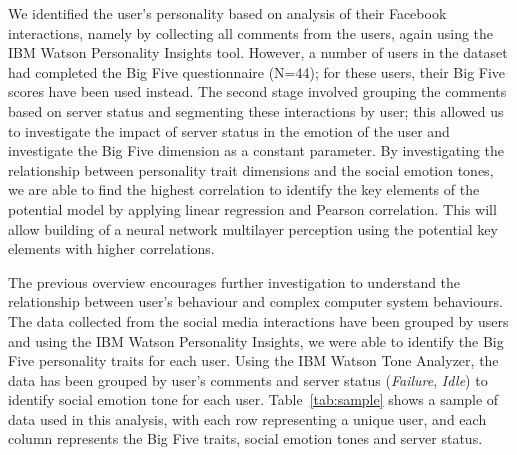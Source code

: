 \documentclass[graybox]{svmult}
\begin{document}
{We identified the user's personality based on analysis of their
Facebook interactions, namely by collecting all comments from the
users, again using the IBM Watson Personality Insights tool. However,
a number of users in the dataset had completed the Big Five
questionnaire (N=44); for these users, their Big Five scores have
been used instead. The second stage involved grouping the comments
based on server status and segmenting these interactions by user; this
allowed us to investigate the impact of server status in the emotion
of the user and investigate the Big Five dimension as a constant
parameter. By investigating the relationship between personality trait
dimensions and the social emotion tones, we are able to find the
highest correlation to identify the key elements of the potential
model by applying linear regression and Pearson correlation. This will
allow building of a neural network multilayer perception using the
potential key elements with higher correlations.

The previous overview encourages further investigation to understand
the relationship between user's behaviour and complex computer system
behaviours. The data collected from the social media interactions have
been grouped by users and using the IBM Watson Personality Insights,
we were able to identify the Big Five personality traits for each
user. Using the IBM Watson Tone Analyzer, the data has been grouped by
user's comments and server status ({\emph{Failure}}, {\emph{Idle}}) to
identify social emotion tone for each user. Table~\ref{tab:sample}
shows a sample of data used in this analysis, with each row
representing a unique user, and each column represents the Big Five
traits, social emotion tones and server status.

}
\end{document}
